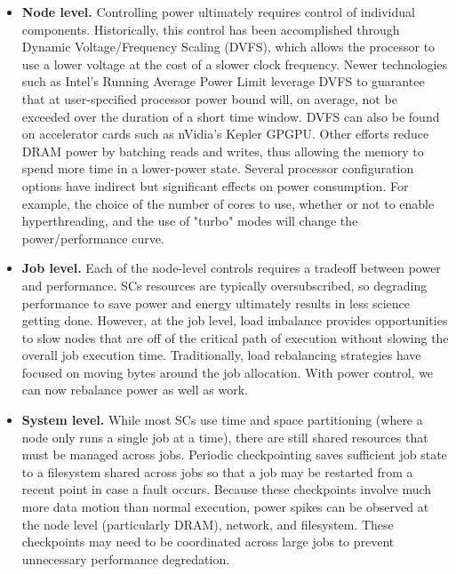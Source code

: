\begin{itemize}
\item \textbf{Node level.} Controlling power ultimately requires control of individual
components.  Historically, this control has been accomplished through Dynamic Voltage/Frequency
Scaling (DVFS), which allows the processor to use a lower voltage at the cost of a slower
clock frequency.  Newer technologies such as Intel's Running Average Power Limit leverage
DVFS to guarantee that at user-specified processor power bound will, on average, not be exceeded 
over the duration of a short time window.  DVFS can also be found on accelerator cards such
as nVidia's Kepler GPGPU.  Other efforts reduce DRAM power by batching reads and writes, thus
allowing the memory to spend more time in a lower-power state.  Several processor configuration
options have indirect but significant effects on power consumption.  For example, the choice
of the number of cores to use, whether or not to enable hyperthreading, and the use of 
"turbo" modes will change the power/performance curve.

\item \textbf{Job level.}  Each of the node-level controls requires a tradeoff between
power and  performance.  SCs resources are typically oversubscribed, so degrading performance
to save power and energy ultimately results in less science getting done.  However, at the 
job level, load imbalance provides opportunities to slow nodes that are off of the critical
path of execution without slowing the overall job execution time.  Traditionally, load 
rebalancing strategies have focused on moving bytes around the job allocation.  With 
power control, we can now rebalance power as well as work.

\item \textbf{System level.}  While most SCs use time and space partitioning (where a node
only runs a single job at a time), there are still shared resources that must be managed
across jobs.  Periodic checkpointing saves sufficient job state to a filesystem shared 
across jobs so that a job may be restarted from a recent point in case a fault occurs.
Because these checkpoints involve much more data motion than normal execution, power 
spikes can be observed at the node level (particularly DRAM), network, and filesystem.
These checkpoints may need to be coordinated across large jobs to prevent unnecessary
performance degredation.


\end{itemize}
